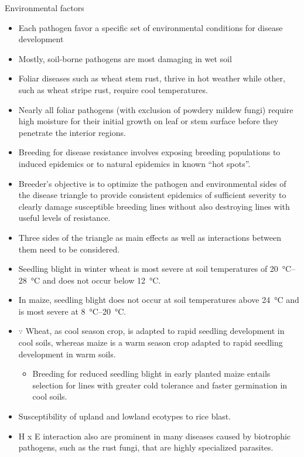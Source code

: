 \documentclass[11pt,dvipsnames,ignorenonframetext,aspectratio=169]{beamer}
\providecommand{\tightlist}{%
  \setlength{\itemsep}{0pt}\setlength{\parskip}{0pt}}
\begin{document}
\begin{frame}{Environmental factors}
\protect\hypertarget{environmental-factors}{}
\small

\begin{itemize}
\tightlist
\item
  Each pathogen favor a specific set of environmental conditions for
  disease development
\item
  Mostly, soil-borne pathogens are most damaging in wet soil
\item
  Foliar diseases such as wheat stem rust, thrive in hot weather while
  other, such as wheat stripe rust, require cool temperatures.
\item
  Nearly all foliar pathogens (with exclusion of powdery mildew fungi)
  require high moisture for their initial growth on leaf or stem surface
  before they penetrate the interior regions.
\item
  Breeding for disease resistance involves exposing breeding populations
  to induced epidemics or to natural epidemics in known ``hot spots''.
\item
  Breeder's objective is to optimize the pathogen and environmental
  sides of the disease triangle to provide consistent epidemics of
  sufficient severity to clearly damage susceptible breeding lines
  without also destroying lines with useful levels of resistance.
\item
  Three sides of the triangle as main effects as well as interactions
  between them need to be considered.
\end{itemize}
\end{frame}

\begin{frame}{}
\protect\hypertarget{section-8}{}
\begin{itemize}
\tightlist
\item
  Seedling blight in winter wheat is most severe at soil temperatures of
  \SIrange{20}{28}{\celsius} and does not occur below \SI{12}{\celsius}.
\item
  In maize, seedling blight does not occur at soil temperatures above
  \SI{24}{\celsius} and is most severe at \SIrange{8}{20}{\celsius}.
\item
  \(\because\) Wheat, as cool season crop, is adapted to rapid seedling
  development in cool soils, whereas maize is a warm season crop adapted
  to rapid seedling development in warm soils.

  \begin{itemize}
  \tightlist
  \item
    Breeding for reduced seedling blight in early planted maize entails
    selection for lines with greater cold tolerance and faster
    germination in cool soils.
  \end{itemize}
\item
  Susceptibility of upland and lowland ecotypes to rice blast.
\item
  H x E interaction also are prominent in many diseases caused by
  biotrophic pathogens, such as the rust fungi, that are highly
  specialized parasites.
\end{itemize}
\end{frame}
\end{document}
